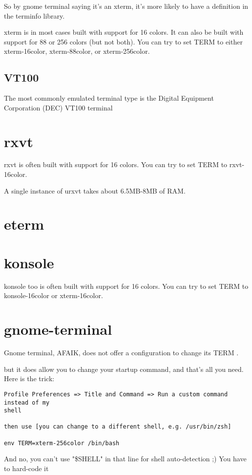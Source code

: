 So by gnome terminal saying it's an xterm, it's more likely to have a definition
in the terminfo library.

xterm is in most cases built with support for 16 colors. It can also be built
with support for 88 or 256 colors (but not both). You can try to set TERM to
either xterm-16color, xterm-88color, or xterm-256color. 

\subsection{VT100}


The most commonly emulated terminal type is the Digital Equipment Corporation
(DEC) VT100 terminal



\section{rxvt}
\label{sec:rxvt}

rxvt is often built with support for 16 colors. You can try to set TERM to
rxvt-16color. 

A single instance of urxvt takes about 6.5MB-8MB of RAM.

\section{eterm}
\label{sec:eterm}

\section{konsole}
\label{sec:konsole}

konsole too is often built with support for 16 colors. You can try to set TERM
to konsole-16color or xterm-16color. 


\section{gnome-terminal}
\label{sec:gnome-terminal}

Gnome terminal, AFAIK, does not offer a configuration to change its TERM .

but it does allow you to change your startup command, and that's all you need.
Here is the trick:

\begin{verbatim}
Profile Preferences => Title and Command => Run a custom command instead of my
shell

then use [you can change to a different shell, e.g. /usr/bin/zsh]

env TERM=xterm-256color /bin/bash

\end{verbatim}
And no, you can't use "\$SHELL" in that line for shell auto-detection ;) You
have to hard-code it

